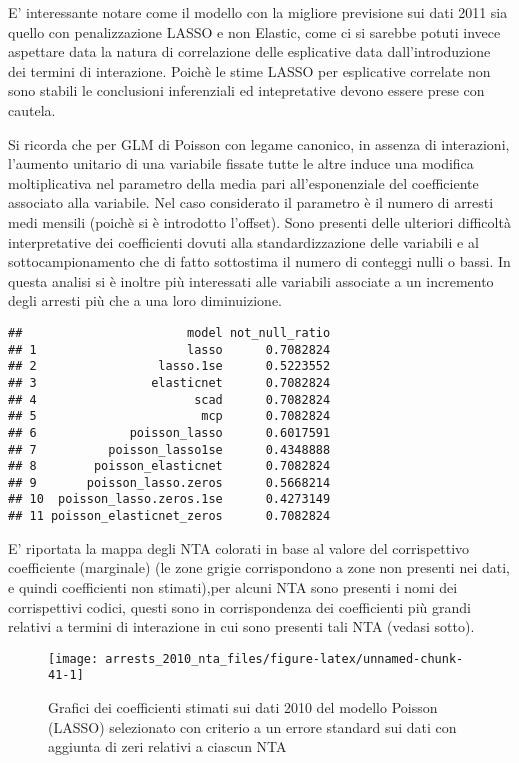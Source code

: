 \documentclass[
  ,
]{article}
\begin{document}
E' interessante notare come il modello con la migliore previsione sui dati 2011 sia quello con penalizzazione LASSO e non Elastic, come ci si sarebbe potuti invece aspettare data la natura di correlazione delle esplicative data dall'introduzione dei termini di interazione.
Poichè le stime LASSO per esplicative correlate non sono stabili le conclusioni inferenziali ed intepretative devono essere prese con cautela.

Si ricorda che per GLM di Poisson con legame canonico, in assenza di interazioni, l'aumento unitario di una variabile fissate tutte le altre induce una modifica moltiplicativa nel parametro della media pari all'esponenziale del coefficiente associato alla variabile. Nel caso considerato il parametro è il numero di arresti medi mensili (poichè si è introdotto l'offset). Sono presenti delle ulteriori difficoltà interpretative dei coefficienti dovuti alla standardizzazione delle variabili e al sottocampionamento che di fatto sottostima il numero di conteggi nulli o bassi. In questa analisi si è inoltre più interessati alle variabili associate a un incremento degli arresti più che a una loro diminuizione.

\begin{verbatim}
##                       model not_null_ratio
## 1                     lasso      0.7082824
## 2                 lasso.1se      0.5223552
## 3                elasticnet      0.7082824
## 4                      scad      0.7082824
## 5                       mcp      0.7082824
## 6             poisson_lasso      0.6017591
## 7          poisson_lasso1se      0.4348888
## 8        poisson_elasticnet      0.7082824
## 9       poisson_lasso.zeros      0.5668214
## 10  poisson_lasso.zeros.1se      0.4273149
## 11 poisson_elasticnet_zeros      0.7082824
\end{verbatim}

E' riportata la mappa degli NTA colorati in base al valore del corrispettivo coefficiente (marginale) (le zone grigie corrispondono a zone non presenti nei dati, e quindi coefficienti non stimati),per alcuni NTA sono presenti i nomi dei corrispettivi codici, questi sono in corrispondenza dei coefficienti più grandi relativi a termini di interazione in cui sono presenti tali NTA (vedasi sotto).

\begin{figure}

{\centering \texttt{[image: arrests\_2010\_nta\_files/figure-latex/unnamed-chunk-41-1]} 

}

\caption{Grafici dei coefficienti stimati sui dati 2010 del modello Poisson (LASSO) selezionato con criterio a un errore standard sui dati con aggiunta di zeri relativi a ciascun NTA}\label{fig:unnamed-chunk-41}
\end{figure}
\end{document}
